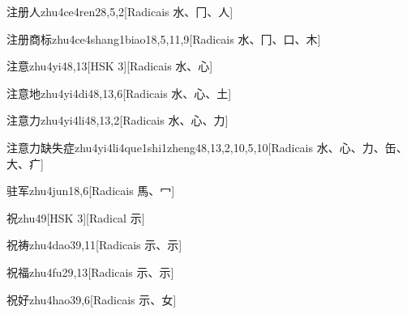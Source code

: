 \begin{entry}{注册人}{zhu4ce4ren2}{8,5,2}[Radicais ⽔、⼌、⼈]
\end{entry}

\begin{entry}{注册商标}{zhu4ce4shang1biao1}{8,5,11,9}[Radicais ⽔、⼌、⼝、⽊]
\end{entry}

\begin{entry}{注意}{zhu4yi4}{8,13}[HSK 3][Radicais ⽔、⼼]
\end{entry}

\begin{entry}{注意地}{zhu4yi4di4}{8,13,6}[Radicais ⽔、⼼、⼟]
\end{entry}

\begin{entry}{注意力}{zhu4yi4li4}{8,13,2}[Radicais ⽔、⼼、⼒]
\end{entry}

\begin{entry}{注意力缺失症}{zhu4yi4li4que1shi1zheng4}{8,13,2,10,5,10}[Radicais ⽔、⼼、⼒、⽸、⼤、⽧]
\end{entry}

\begin{entry}{驻军}{zhu4jun1}{8,6}[Radicais ⾺、⼍]
\end{entry}

\begin{entry}{祝}{zhu4}{9}[HSK 3][Radical ⽰]
\end{entry}

\begin{entry}{祝祷}{zhu4dao3}{9,11}[Radicais ⽰、⽰]
\end{entry}

\begin{entry}{祝福}{zhu4fu2}{9,13}[Radicais ⽰、⽰]
\end{entry}

\begin{entry}{祝好}{zhu4hao3}{9,6}[Radicais ⽰、⼥]
\end{entry}

